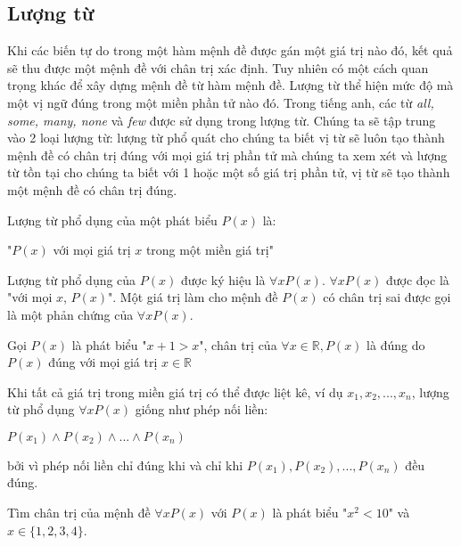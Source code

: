 \documentclass{standalone} %
\begin{document}
    \subsection{Lượng từ}
        
        Khi các biến tự do trong một hàm mệnh đề được gán một giá trị nào đó, kết quả sẽ thu được một mệnh đề với chân trị xác định. Tuy nhiên có một cách quan trọng khác để xây dựng mệnh đề từ hàm mệnh đề. Lượng từ thể hiện mức độ mà một vị ngữ đúng trong một miền phần tử nào đó. Trong tiếng anh, các từ \textit{all, some, many, none} và \textit{few} được sử dụng trong lượng từ. Chúng ta sẽ tập trung vào 2 loại lượng từ: lượng từ phổ quát cho chúng ta biết vị từ sẽ luôn tạo thành mệnh đề có chân trị đúng với mọi giá trị phần tử mà chúng ta xem xét và lượng từ tồn tại cho chúng ta biết với 1 hoặc một số giá trị phần tử, vị từ sẽ tạo thành một mệnh đề có chân trị đúng.
        
        \begin{definition}
            Lượng từ phổ dụng của một phát biểu $P(x)$ là:
            \begin{center}
                "$P(x)$ với mọi giá trị $x$ trong một miền giá trị" 
            \end{center}
            Lượng từ phổ dụng của $P(x)$ được ký hiệu là $\forall x P(x)$. $\forall x P(x)$ được đọc là "với mọi $x$, $P(x)$". Một giá trị làm cho mệnh đề $P(x)$ có chân trị sai được gọi là một phản chứng của $\forall x P(x)$.
        \end{definition}
        
        \begin{example}
            Gọi $P(x)$ là phát biểu "$x + 1 > x$", chân trị của $\forall x \in \mathbb{R}, P(x)$ là đúng do $P(x)$ đúng với mọi giá trị $x \in \mathbb{R}$
        \end{example}
        
        Khi tất cả giá trị trong miền giá trị có thể được liệt kê, ví dụ $x_1, x_2, ..., x_n$, lượng từ phổ dụng $\forall x P(x)$ giống như phép nối liền:
        \begin{center}
            $P(x_1) \land P(x_2) \land ... \land P(x_n)$
        \end{center}
        bởi vì phép nối liền chỉ đúng khi và chỉ khi $P(x_1), P(x_2), ..., P(x_n)$ đều đúng.
        
        \begin{example}
            Tìm chân trị của mệnh đề $\forall x P(x)$ với $P(x)$ là phát biểu "$x^2 < 10$" và $x \in \{1, 2, 3, 4\}$.
        \end{example}
        
\end{document}

